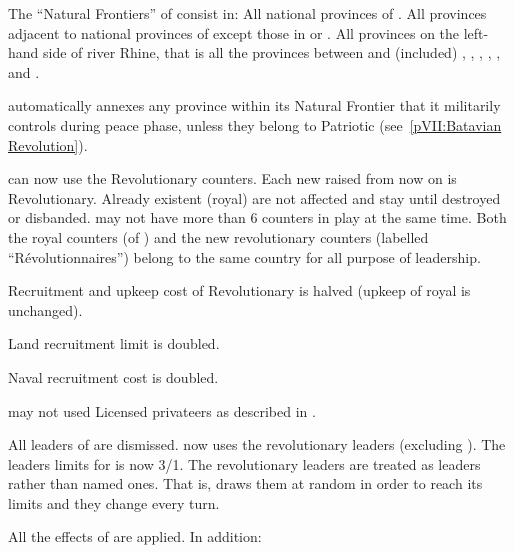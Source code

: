 \begin{digressions}

  \condition{}
  \aparag The ``Natural Frontiers'' of \FRA consist in:
  \bparag All national provinces of \FRA.
  \bparag All provinces adjacent to national provinces of \FRA except those in
  \HIS or \paysSuisse.
  \bparag All provinces on the left-hand side of river Rhine, that is all the
  provinces between \FRA and (included) \provinceAlsace, \provincePfalz,
  \provinceTrier, \provinceKoln, \provinceLimburg, \provinceUtrecht and
  \provinceZeeland.

  \phpaix
  \aparag \FRA automatically annexes any province within its Natural Frontier
  that it militarily controls during peace phase, unless they belong to
  Patriotic \HOL (see~\ref{pVII:Batavian Revolution}).



  \phadm
  \aparag \FRA can now use the Revolutionary \ARMY counters.
  \bparag Each new \ARMY raised from now on is Revolutionary.
  \bparag Already existent (royal) \ARMY are not affected and stay until
  destroyed or disbanded.
  \bparag \FRA may not have more than 6 \ARMY counters in play at the same
  time.
  \bparag Both the royal counters (of \FRA) and the new revolutionary counters
  (labelled ``Révolutionnaires'') belong to the same country for all purpose
  of leadership.

  \aparag Recruitment and upkeep cost of Revolutionary \ARMY is halved (upkeep
  of royal \ARMY is unchanged).

  \aparag Land recruitment limit is doubled.

  \aparag Naval recruitment cost is doubled.

  \aparag \FRA may not used Licensed privateers as described in
  .

  \bparag All leaders of \FRA are dismissed. \FRA now uses the revolutionary
  leaders (excluding \leaderBonaparte).
  \bparag The leaders limits for \FRA is now 3\LeaderG/1\LeaderA.
  \bparag The revolutionary leaders are treated as \anonyme leaders rather
  than named ones. That is, \FRA draws them at random in order to reach
  its limits and they change every turn.

  All the effects of  are applied. In
  addition:


\end{digressions}

